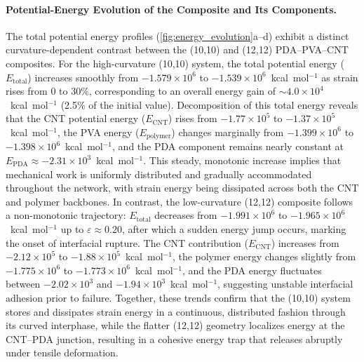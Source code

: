 \documentclass[journal=jacsat,manuscript=article]{achemso}
\begin{document}
{\paragraph{Potential-Energy Evolution of the Composite and Its Components.}
The total potential energy profiles (\autoref{fig:energy_evolution}a–d) exhibit a distinct curvature-dependent contrast between the (10,10) and (12,12) PDA–PVA–CNT composites. For the high-curvature (10,10) system, the total potential energy ($E_\mathrm{total}$) increases smoothly from $-1.579\times10^{6}$ to $-1.539\times10^{6}$~kcal~mol$^{-1}$ as strain rises from 0 to 30\%, corresponding to an overall energy gain of $\sim4.0\times10^{4}$~kcal~mol$^{-1}$ (2.5\% of the initial value). Decomposition of this total energy reveals that the CNT potential energy ($E_\mathrm{CNT}$) rises from $-1.77\times10^{5}$ to $-1.37\times10^{5}$~kcal~mol$^{-1}$, the PVA energy ($E_\mathrm{polymer}$) changes marginally from $-1.399\times10^{6}$ to $-1.398\times10^{6}$~kcal~mol$^{-1}$, and the PDA component remains nearly constant at $E_\mathrm{PDA}\approx -2.31\times10^{3}$~kcal~mol$^{-1}$. This steady, monotonic increase implies that mechanical work is uniformly distributed and gradually accommodated throughout the network, with strain energy being dissipated across both the CNT and polymer backbones. In contrast, the low-curvature (12,12) composite follows a non-monotonic trajectory: $E_\mathrm{total}$ decreases from $-1.991\times10^{6}$ to $-1.965\times10^{6}$~kcal~mol$^{-1}$ up to $\varepsilon\approx0.20$, after which a sudden energy jump occurs, marking the onset of interfacial rupture. The CNT contribution ($E_\mathrm{CNT}$) increases from $-2.12\times10^{5}$ to $-1.88\times10^{5}$~kcal~mol$^{-1}$, the polymer energy changes slightly from $-1.775\times10^{6}$ to $-1.773\times10^{6}$~kcal~mol$^{-1}$, and the PDA energy fluctuates between $-2.02\times10^{3}$ and $-1.94\times10^{3}$~kcal~mol$^{-1}$, suggesting unstable interfacial adhesion prior to failure. Together, these trends confirm that the (10,10) system stores and dissipates strain energy in a continuous, distributed fashion through its curved interphase, while the flatter (12,12) geometry localizes energy at the CNT–PDA junction, resulting in a cohesive energy trap that releases abruptly under tensile deformation.


}
\end{document}
